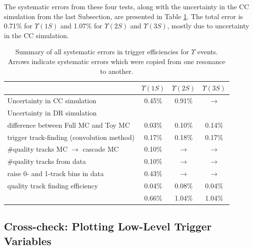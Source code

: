 The systematic errors from these four tests, along with the
uncertainty in the CC simulation from the last Subsection, are
presented in Table \ref{trigger_finalerrors}.  The total error is
0.71\% for $\Upsilon(1S)$ and 1.07\% for $\Upsilon(2S)$ and
$\Upsilon(3S)$, mostly due to uncertainty in the CC simulation.

\begin{table}[p]
  \caption{\label{trigger_finalerrors} Summary of all systematic
    errors in trigger efficiencies for $\Upsilon$ events.  Arrows
    indicate systematic errors which were copied from one resonance to
    another.}
  \begin{center}
    \begin{tabular}{l c c c}
      & $\Upsilon(1S)$ & $\Upsilon(2S)$ & $\Upsilon(3S)$ \\\hline
      Uncertainty in CC simulation             & 0.45\% & 0.91\% & $\longrightarrow$ \\
      Uncertainty in DR simulation             &        &        &        \\
      \mbox{\hspace{0.5 cm}} difference between Full MC and Toy MC      & 0.03\% & 0.10\% & 0.14\% \\
      \mbox{\hspace{0.5 cm}} trigger track-finding (convolution method) & 0.17\% & 0.18\% & 0.17\% \\
      \mbox{\hspace{0.5 cm}} \#quality tracks MC $\to$ cascade MC       & 0.10\% & $\longrightarrow$ & $\longrightarrow$ \\
      \mbox{\hspace{0.5 cm}} \#quality tracks from data                 & 0.10\% & $\longrightarrow$ & $\longrightarrow$ \\
      \mbox{\hspace{0.5 cm}} raise 0- and 1-track bins in data          & 0.43\% & $\longrightarrow$ & $\longrightarrow$ \\
      \mbox{\hspace{0.5 cm}} quality track finding efficiency           & 0.04\% & 0.08\% & 0.04\% \\\hline
                                               & 0.66\% & 1.04\% & 1.04\%
    \end{tabular}
  \end{center}
\end{table}

\subsection{Cross-check: Plotting Low-Level Trigger Variables} \label{trigger:subsection_lowlevel}

